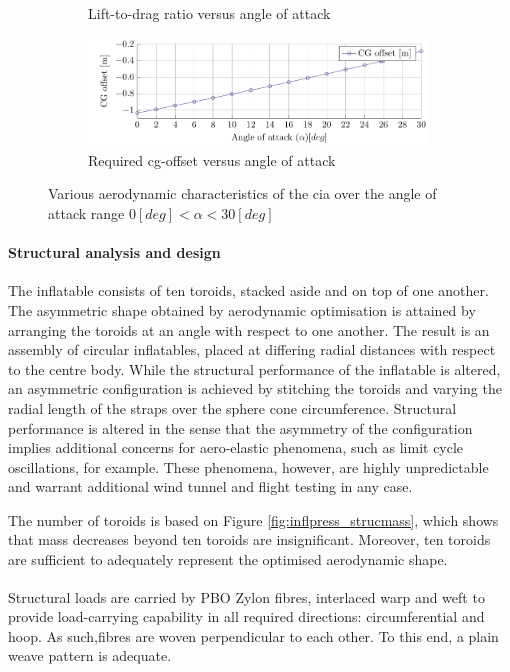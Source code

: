 \begin{figure}[h]
\begin{subfigure}[b]{0.49\textwidth}
 		\caption{Lift-to-drag ratio versus angle of attack}
 		\label{fig:CLCDAlpha}
 	\end{subfigure}
 	\begin{subfigure}[b]{0.49\textwidth}
 		\includegraphics[width=0.99\textwidth]{./Figure/Aerodynamics/CGoAlpha.pdf}
 		\caption{Required \gls{cg}-offset versus angle of attack}
 		\label{fig:CGOAlpha}
 	\end{subfigure}
 	\caption{Various aerodynamic characteristics of the \acrlong{cia} over the angle of attack range $0 \left[deg\right]<\alpha<30 \left[deg\right]$}
 \end{figure}

\paragraph{Structural analysis and design}
The inflatable consists of ten toroids, stacked aside and on top of one another. The asymmetric shape obtained by aerodynamic optimisation is attained by arranging the toroids at an angle with respect to one another. The result is an assembly of circular inflatables, placed at differing radial distances with respect to the centre body. While the structural performance of the inflatable is altered, an asymmetric configuration is achieved by stitching the toroids and varying the radial length of the straps over the sphere cone circumference. Structural performance is altered in the sense that the asymmetry of the configuration implies additional concerns for aero-elastic phenomena, such as limit cycle oscillations, for example. These phenomena, however, are highly unpredictable and warrant additional wind tunnel and flight testing in any case. 

The number of toroids is based on Figure \ref{fig:inflpress_strucmass}, which shows that mass decreases beyond ten toroids are insignificant. Moreover, ten toroids are sufficient to adequately represent the optimised aerodynamic shape. 

Structural loads are carried by PBO Zylon\textsuperscript{\textregistered} fibres, interlaced warp and weft to provide load-carrying capability in all required directions: circumferential and hoop. As such,fibres are woven perpendicular to each other. To this end, a plain weave pattern is adequate.

